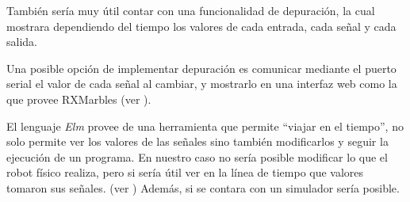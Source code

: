   También sería muy útil contar con una funcionalidad de depuración, la cual
mostrara dependiendo del tiempo los valores de cada entrada, cada señal y cada
salida.

  Una posible opción de implementar depuración es comunicar
mediante el puerto serial el valor de cada señal al cambiar,
y mostrarlo en una interfaz web como la que provee
RXMarbles (ver \cite{rxmarbles}). 

  El lenguaje \textit{Elm} provee de una herramienta que permite ``viajar en el 
tiempo'', no solo permite ver los valores de las señales sino también
modificarlos y seguir la ejecución de un programa.
  En nuestro caso no sería posible modificar lo que el robot físico
realiza, pero si sería útil ver en la línea de tiempo que valores
tomaron sus señales. (ver \cite{elmdebug}) Además, si se contara
con un simulador sería posible.



